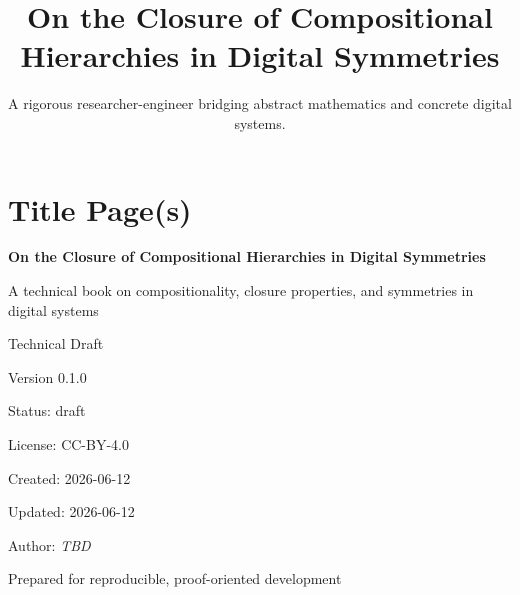 \documentclass[11pt]{article}
\title{On the Closure of Compositional Hierarchies in Digital Symmetries}
\author{A rigorous researcher-engineer bridging abstract mathematics and concrete digital systems.}
\begin{document}
\section*{Title Page(s)}

\begin{titlepage}
\centering
\vspace*{1.25in}

{\Huge\bfseries On the Closure of Compositional Hierarchies in Digital Symmetries\par}
\vspace{0.35in}
{\Large A technical book on compositionality, closure properties, and symmetries in digital systems\par}
\vspace{0.85in}

{\large Technical Draft\par}
\vspace{0.25in}
{\large Version 0.1.0\par}
\vspace{0.25in}
{\large Status: draft\par}
\vspace{0.25in}
{\large License: CC-BY-4.0\par}
\vspace{0.25in}
{\large Created: 2026-06-12\par}
\vspace{0.25in}
{\large Updated: 2026-06-12\par}
\vspace{0.25in}
{\large Author: \textit{TBD}\par}

\vfill

{\large Prepared for reproducible, proof-oriented development\par}
\end{titlepage}

\cleardoublepage
\end{document}
